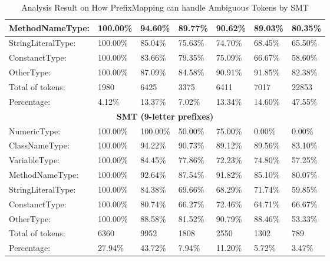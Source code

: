 \begin{table}[]
\begin{tabular}{|l|l|l|l|l|l|l|}
MethodNameType:                   & 100.00\%  & 94.60\%   & 89.77\%   & 90.62\%   & 89.03\%   & 80.35\%          \\ \hline
StringLiteralType:                & 100.00\%  & 85.04\%   & 75.63\%   & 74.70\%   & 68.45\%   & 65.50\%          \\ \hline
ConstanctType:                    & 100.00\%  & 83.66\%   & 79.35\%   & 75.09\%   & 66.67\%   & 58.60\%          \\ \hline
OtherType:                        & 100.00\%  & 87.09\%   & 84.58\%   & 90.91\%   & 91.85\%   & 82.38\%          \\ \hline
Total of tokens:                  & 1980      & 6425      & 3375      & 6411      & 7017      & 22853            \\ \hline
Percentage:                       & 4.12\%    & 13.37\%   & 7.02\%    & 13.34\%   & 14.60\%   & 47.55\%          \\ \hline
\multicolumn{7}{|c|}{\textbf{SMT (9-letter prefixes)}}                                                           \\ \hline
NumericType:                      & 100.00\%  & 100.00\%  & 50.00\%   & 75.00\%   & 0.00\%    & 0.00\%           \\ \hline
ClassNameType:                    & 100.00\%  & 94.22\%   & 90.73\%   & 89.12\%   & 89.56\%   & 83.10\%          \\ \hline
VariableType:                     & 100.00\%  & 84.45\%   & 77.86\%   & 72.23\%   & 74.80\%   & 57.25\%          \\ \hline
MethodNameType:                   & 100.00\%  & 92.64\%   & 87.54\%   & 91.82\%   & 85.10\%   & 80.07\%          \\ \hline
StringLiteralType:                & 100.00\%  & 84.38\%   & 69.66\%   & 68.29\%   & 71.74\%   & 59.85\%          \\ \hline
ConstanctType:                    & 100.00\%  & 80.74\%   & 66.27\%   & 72.46\%   & 64.71\%   & 66.67\%          \\ \hline
OtherType:                        & 100.00\%  & 88.58\%   & 81.52\%   & 90.79\%   & 88.46\%   & 53.33\%          \\ \hline
Total of tokens:                  & 6360      & 9952      & 1808      & 2550      & 1302      & 789              \\ \hline
Percentage:                       & 27.94\%   & 43.72\%   & 7.94\%    & 11.20\%   & 5.72\%    & 3.47\%           \\ \hline
\end{tabular}
\caption{Analysis Result on How PrefixMapping can handle Ambiguous Tokens by SMT}
\label{tblAnaPercentageMappingSMT}
\end{table}

